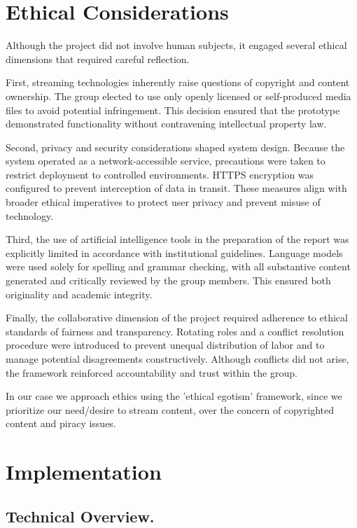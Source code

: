 \documentclass[11pt]{article}
\begin{document}
\section{Ethical Considerations}
Although the project did not involve human subjects, it engaged several ethical dimensions that required careful reflection.

First, streaming technologies inherently raise questions of copyright and content ownership. The group elected to use only openly licensed or self-produced media files to avoid potential infringement. This decision ensured that the prototype demonstrated functionality without contravening intellectual property law.

Second, privacy and security considerations shaped system design. Because the system operated as a network-accessible service, precautions were taken to restrict deployment to controlled environments. HTTPS encryption was configured to prevent interception of data in transit. These measures align with broader ethical imperatives to protect user privacy and prevent misuse of technology.

Third, the use of artificial intelligence tools in the preparation of the report was explicitly limited in accordance with institutional guidelines. Language models were used solely for spelling and grammar checking, with all substantive content generated and critically reviewed by the group members. This ensured both originality and academic integrity.

Finally, the collaborative dimension of the project required adherence to ethical standards of fairness and transparency. Rotating roles and a conflict resolution procedure were introduced to prevent unequal distribution of labor and to manage potential disagreements constructively. Although conflicts did not arise, the framework reinforced accountability and trust within the group.

In our case we approach ethics using the 'ethical egotism' framework, since we prioritize our need/desire to stream content, over the concern of copyrighted content and piracy issues.

\section{Implementation}
\subsection{Technical Overview.}
\end{document}
